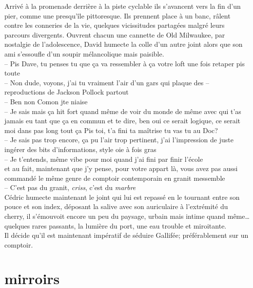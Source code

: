 \documentclass{article}
\begin{document}
Arrivé à la promenade derrière à la piste cyclable ils s'avancent vers la
fin d'un pier, comme une presqu'île pittoresque.
Ils prennent place à un
banc, râlent contre les conneries de la vie, quelques vicissitudes partagées
malgré leurs parcours divergents. Ouvrent chacun une cannette de Old Milwaukee,
par nostalgie de l'adolescence, David humecte la colle d'un autre joint alors que
son ami s'essoufle d'un soupir mélancolique mais paisible. \\
-- Pis Dave, tu penses tu que ça va ressembler à ça votre loft une fois retaper pis toute\\
-- Non dude, voyons, j'ai tu vraiment l'air d'un gars qui plaque des
-- reproductions de Jackson Pollock partout \\
-- Ben non Comon jte niaise\\
-- Je sais mais ça hit fort quand même de voir du monde de même avec qui
t'as jamais eu tant que ça en commun et te dire, ben oui ce serait logique,
ce serait moi dans pas long tout ça \textelp{} Pis toi, t'a fini ta maîtrise tu
vas tu au Doc?\\
-- Je sais pas trop encore, ça pu l'air trop pertinent, j'ai l'impression
de juste ingérer des bits d'informations, style oie à fois gras\\
-- Je t'entends, même vibe pour moi quand j'ai fini par finir l'école\\

\textelp{} et au fait, maintenant que j'y pense, pour votre appart là, vous
avez pas aussi commandé le même genre de comptoir contemporain en granit
messemble\\
-- C'est pas du granit, \emph{criss}, c'est du \emph{marbre}\\

Cédric humecte maintenant le joint qui lui est repassé en le tournant entre son
pouce et son index, déposant la salive avec son auriculaire à l'extrémité du
cherry, il s'émouvoit encore un peu du paysage, urbain mais intime quand
même\ldots quelques rares passants, la lumière du port, une eau trouble et
miroitante.\\[1ex]
Il décide qu'il est maintenant impératif de séduire Gallifée; préférablement sur un comptoir.
\clearpage


\section{mirroirs}
\end{document}
